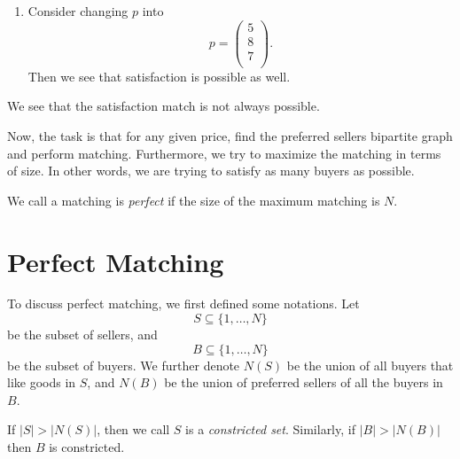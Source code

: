 \begin{eg}
\begin{enumerate}
		\item Consider changing \(p\) into
		      \[
			      p = \begin{pmatrix}
				      5 \\
				      8 \\
				      7 \\
			      \end{pmatrix}.
		      \]
		      Then we see that satisfaction is possible as well.
		      \begin{figure}[H]
			      \centering
			      \label{fig:satisfaction-eg-3}
		      \end{figure}
	\end{enumerate}
\end{eg}

\begin{remark}
	We see that the satisfaction match is not always possible.
\end{remark}

Now, the task is that for any given price, find the preferred sellers bipartite graph and perform matching. Furthermore, we try to
maximize the matching in terms of size. In other words, we are trying to satisfy as many buyers as possible.

\begin{note}
	We call a matching is \emph{perfect} if the size of the maximum matching is \(N\).
\end{note}

\section{Perfect Matching}
To discuss perfect matching, we first defined some notations. Let
\[
	S\subseteq \{1, \ldots , N\}
\] be the subset of sellers, and
\[
	B\subseteq\{1, \ldots , N\}
\]
be the subset of buyers. We further denote \(N(S)\) be the union of all buyers that like goods in \(S\), and \(N(B)\) be the union
of preferred sellers of all the buyers in \(B\).

If \(\left\vert S \right\vert > \left\vert N(S) \right\vert \), then we call \(S\) is a \emph{constricted set}. Similarly, if
\(\left\vert B \right\vert > \left\vert N(B) \right\vert \) then \(B\) is constricted.

